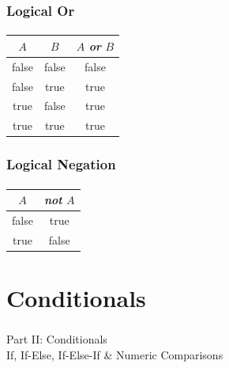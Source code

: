 \documentclass[]{beamer}
\begin{document}
\begin{frame}
    \frametitle{Logical Or}
    \framesubtitle{}

    \begin{center}
    \begin{tabular}{c|c|c}
    $A$ & $B$ & $A$ \emph{or} $B$ \\
    \hline\hline
    false & false & false\\
    false & true & true\\
    true & false & true\\
    true & true & true\\
    \end{tabular}
    \end{center}
    
    
\end{frame}

\begin{frame}
    \frametitle{Logical Negation}
    \framesubtitle{}

    \begin{center}
    \begin{tabular}{c|c}
    $A$  & \emph{not} $A$ \\
    \hline\hline
    false & true\\
    true & false\\
    \end{tabular}
    \end{center}

    
\end{frame}

  
\section{Conditionals}

\begin{frame}
    \frametitle{}
    \framesubtitle{}
    
    \begin{center}
    {\Huge Part II: Conditionals}\\
    {\Large If, If-Else, If-Else-If \& Numeric Comparisons}
    \end{center}


\end{frame}
\end{document}
